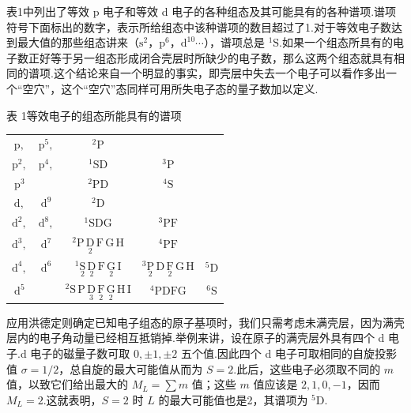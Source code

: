 表1中列出了等效 p 电子和等效 d 电子的各种组态及其可能具有的各种谱项.谱项符号下面标出的数字，表示所给组态中该种谱项的数目超过了1.对于等效电子数达到最大值的那些组态讲来（$\mathrm{s}^2$，$\mathrm{p}^6$，$\mathrm{d}^{10}\cdots$），谱项总是 ${}^{1}\mathrm{S}$.如果一个组态所具有的电子数正好等于另一组态形成闭合壳层时所缺少的电子数，那么这两个组态就具有相同的谱项.这个结论来自一个明显的事实，即壳层中失去一个电子可以看作多出一个“空穴”，这个“空穴”态同样可用所失电子态的量子数加以定义.

\begin{center}
{\heiti 表 1}\quad 等效电子的组态所能具有的谱项\\[0.8em]
\begin{tabular}{cc|ccc}
\hline
$\mathrm{p},$ & $\mathrm{p}^{5},$ & ${}^{2}\mathrm{P}$ & & \\
$\mathrm{p}^{2},$ & $\mathrm{p}^{4},$ & ${}^{1}\mathrm{SD}$ & ${}^{3}\mathrm{P}$ & \\
$\mathrm{p}^{3}$ & & ${}^{2}\mathrm{PD}$ & ${}^{4}\mathrm{S}$ & \\
\hline
$\mathrm{d},$ & $\mathrm{d}^{9}$ & ${}^{2}\mathrm{D}$ & & \\
$\mathrm{d}^{2},$ & $\mathrm{d}^{8},$ & ${}^{1}\mathrm{SDG}$ & ${}^{3}\mathrm{PF}$ & \\
$\mathrm{d}^{3},$ & $\mathrm{d}^{7}$ & ${}^{2}\mathrm{P}\,\underset{2}{\mathrm{D}}\,\mathrm{F}\,\mathrm{G}\,\mathrm{H}$ & ${}^{4}\mathrm{PF}$ & \\
$\mathrm{d}^{4},$ & $\mathrm{d}^{6}$ & ${}^{1}\underset{2}{\mathrm{S}}\,\underset{2}{\mathrm{D}}\,\mathrm{F}\,\underset{2}{\mathrm{G}}\,\mathrm{I}$ & ${}^{3}\underset{2}{\mathrm{P}}\,\mathrm{D}\,\underset{2}{\mathrm{F}}\,\mathrm{G}\,\mathrm{H}$ & ${}^{5}\mathrm{D}$ \\
$\mathrm{d}^{5}$ & & ${}^{2}\mathrm{S}\,\mathrm{P}\,\underset{3}{\mathrm{D}}\,\underset{2}{\mathrm{F}}\,\underset{2}{\mathrm{G}}\,\mathrm{H}\,\mathrm{I}$ & ${}^{4}\mathrm{PDFG}$ & ${}^{6}\mathrm{S}$ \\
\hline
\end{tabular}
\end{center}

应用洪德定则确定已知电子组态的原子基项时，我们只需考虑未满壳层，因为满壳层内的电子角动量已经相互抵销掉.举例来讲，设在原子的满壳层外具有四个 d 电子.d 电子的磁量子数可取 $0,\pm1,\pm2$ 五个值.因此四个 d 电子可取相同的自旋投影值 $\sigma=1/2$，总自旋的最大可能值从而为 $S=2$.此后，这些电子必须取不同的 $m$ 值，以致它们给出最大的 $M_L=\sum m$ 值；这些 $m$ 值应该是 $2,1,0,-1$，因而 $M_L=2$.这就表明，$S=2$ 时 $L$ 的最大可能值也是2，其谱项为 ${}^{5}\mathrm{D}$.

